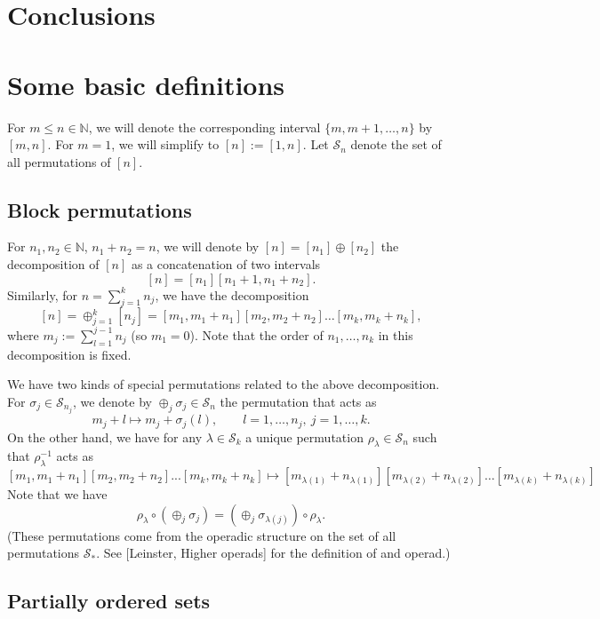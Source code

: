 \documentclass[12pt]{article}
\theoremstyle{definition}
\theoremstyle{remark}
\def\permut{\mathscr{S}}
\begin{document}
\section{Conclusions}





\appendix


\section{Some basic definitions}


For $m\le n\in \mathbb N$, we will denote the corresponding interval $\{m,m+1,\dots,n\}$ by
$[m,n]$. For $m=1$, we will simplify to  $[n]:=[1,n]$. Let $\permut_n$ denote the set of all permutations of $[n]$.


\subsection{Block permutations}
\label{sec:permut}


 For $n_1,n_2\in \mathbb N$, $n_1+n_2=n$, 
we will denote by $[n]=[n_1]\oplus [n_2]$ the decomposition of $[n]$ as a concatenation of two 
intervals
\[
[n]=[n_1][n_1+1,n_1+n_2].
\]
Similarly, for $n=\sum_{j=1}^kn_j$, we have the decomposition
\[
[n]=\oplus_{j=1}^k[n_j]=[m_1,m_1+n_1][m_2,m_2+n_2]\dots[m_k,m_k+n_k],
\]
where $m_j:=\sum_{l=1}^{j-1} n_j$ (so $m_1=0$). Note that the order of $n_1,\dots, n_k$ in
this decomposition is
fixed. 

We have two kinds of special permutations related to the above decomposition. For
$\sigma_j\in \permut_{n_j}$, we denote by $\oplus_j \sigma_j\in \permut_n$ the permutation that acts as
\[
m_j+l\mapsto m_j+\sigma_j(l),\qquad l=1,\dots,n_j,\ j=1,\dots, k. 
\]
On the other hand, we have for any $\lambda\in \permut_k$ a unique permutation
$\rho_\lambda\in\permut_n$  such that $\rho_\lambda^{-1}$ acts as
\[
[m_1,m_1+n_1][m_2,m_2+n_2]...[m_k,m_k+n_k]\mapsto
[m_{\lambda(1)}+n_{\lambda(1)}][m_{\lambda(2)}+n_{\lambda(2)}]\dots[m_{\lambda(k)}+n_{\lambda(k)}]
\]
Note that we have
\[
\rho_\lambda\circ(\oplus_j\sigma_j)=(\oplus_j \sigma_{\lambda(j)})\circ\rho_\lambda.
\]
(These permutations  come from the operadic structure on the set of
all permutations $\permut_*$. See [Leinster, Higher operads] for the definition of and operad.)



\subsection{Partially ordered sets}\label{app:poset}
\end{document}
